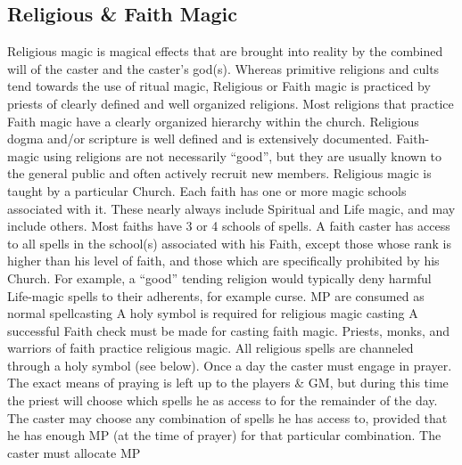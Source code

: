\documentclass[twoside]{book}
\begin{document}
\subsection{Religious \& Faith Magic}
      Religious magic is magical effects that are brought
               into reality by the combined will of the caster and the
               caster’s god(s). Whereas primitive religions and
               cults tend towards the use of ritual magic, Religious or
               Faith magic is practiced by priests of clearly defined and
               well organized religions. Most religions that practice
               Faith magic have a clearly organized hierarchy within the
               church. Religious dogma and/or scripture is well defined
               and is extensively documented. Faith-magic using religions
               are not necessarily “good”, but they are
               usually known to the general public and often actively
               recruit new members.   Religious magic is taught by a particular Church.
               Each faith has one or more magic schools associated with
               it. These nearly always include Spiritual and Life magic,
               and may include others. Most faiths have 3 or 4 schools of
               spells. A faith caster has access to all spells in the
               school(s) associated with his Faith, except those whose
               rank is higher than his level of faith, and those which
               are specifically prohibited by his Church. For example, a
               “good” tending religion would typically deny
               harmful Life-magic spells to their adherents, for example
               curse.   
                MP are consumed as normal spellcasting   
                  A holy symbol is required for religious magic
                 casting 
                  A successful Faith check must be made for casting
                 faith magic. 
              Priests, monks, and warriors of faith practice
               religious magic. All religious spells are channeled
               through a holy symbol (see below).   Once a day the caster must engage in prayer. The
               exact means of praying is left up to the players \& GM,
               but during this time the priest will choose which spells
               he as access to for the remainder of the day. The caster
               may choose any combination of spells he has access to,
               provided that he has enough MP (at the time of prayer) for
               that particular combination. The caster must allocate MP
\end{document}
